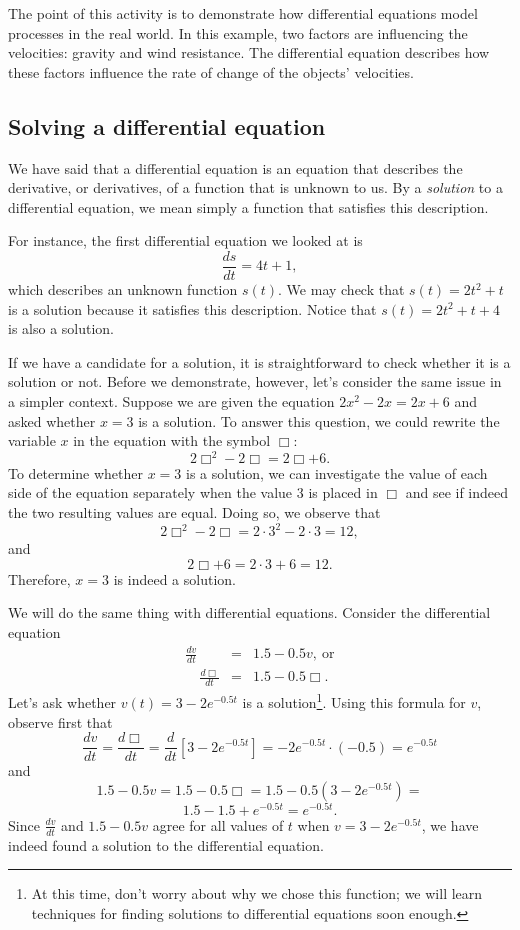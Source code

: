 
The point of this activity is to demonstrate how differential equations model processes in the real world.  In this example, two factors are influencing the velocities:  gravity and wind resistance. The differential equation describes how these factors influence the rate of change of the objects' velocities.

\subsection*{Solving a differential equation} 

We have said that a differential equation is an equation that describes the derivative,  or derivatives, of a function that is unknown to us.  By a {\em   solution} to a differential equation, we mean simply a function that satisfies this description.

For instance, the first differential equation we looked at is 
$$ \frac{ds}{dt} = 4t+1, $$
which describes an unknown function $s(t)$.  We may check that $s(t) = 2t^2+t$ is a solution because it satisfies this description.  Notice that $s(t) = 2t^2+t+4$ is also a solution.

If we have a candidate for a solution, it is straightforward to check whether it is a solution or not.  Before we demonstrate, however, let's consider the same issue in a simpler context. Suppose we are given the equation $2x^2 - 2x = 2x+6$ and asked whether $x=3$ is a solution.  To answer this question, we could rewrite the variable $x$ in the equation with the symbol $\Box$:
$$ 2\Box^2 - 2\Box = 2\Box + 6. $$
To determine whether $x=3$ is a solution, we can investigate the value of each side of the equation separately when the value $3$ is placed in $\Box$ and see if indeed the two resulting values are equal.  Doing so, we observe that 
$$2\Box^2 - 2\Box = 2\cdot3^2 - 2\cdot3 = 12,$$
and
$$2\Box + 6 = 2\cdot3 + 6 = 12.$$
Therefore, $x=3$ is indeed a solution.

We will do the same thing with differential equations.  Consider the differential equation 
\begin{eqnarray*}
\frac{dv}{dt} & = & 1.5 - 0.5v, \ \mbox{or} \\
\quad \frac{d\Box}{dt} & = & 1.5 - 0.5\Box.
\end{eqnarray*}
Let's ask whether $v(t) = 3 - 2e^{-0.5t}$ is a solution\footnote{At this time, don't worry about why we chose this function;  we will learn techniques for finding solutions to differential equations soon enough.  }.  Using this formula for $v$, observe first that
$$\frac{dv}{dt} =  \frac{d\Box}{dt}  = \frac{d}{dt}[3 - 2e^{-0.5t}] = -2e^{-0.5t} \cdot (-0.5) = e^{-0.5t}$$
and
$$1.5 - 0.5v = 1.5 - 0.5\Box= 1.5 - 0.5(3 - 2e^{-0.5t}) = $$
$$1.5 - 1.5 + e^{-0.5t} = e^{-0.5t}.$$
Since $\frac{dv}{dt}$ and $1.5 - 0.5v$ agree for all values of $t$ when $v = 3-2e^{-0.5t}$, we have indeed
found a solution to the differential equation.

